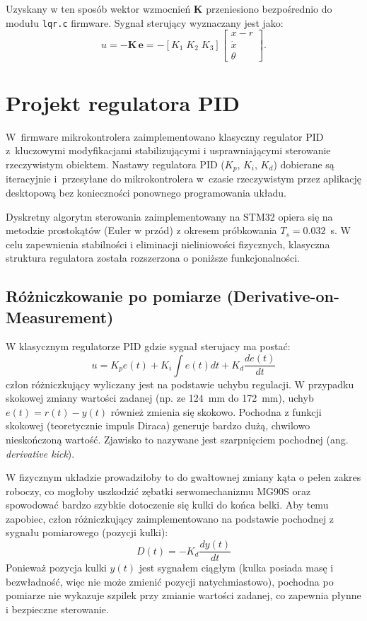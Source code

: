 Uzyskany w ten sposób wektor wzmocnień $\mathbf{K}$ przeniesiono bezpośrednio do modułu
\texttt{lqr.c} firmware.
Sygnał sterujący wyznaczany jest jako:
\begin{equation}
  u = -\mathbf{K}\,\mathbf{e} = -[K_1\;K_2\;K_3]\begin{bmatrix} x - r \\ \dot{x} \\ \theta \end{bmatrix}.
\end{equation}


\section{Projekt regulatora PID}

W~firmware mikrokontrolera zaimplementowano klasyczny regulator PID
z~kluczowymi modyfikacjami stabilizującymi i usprawniającymi sterowanie
rzeczywistym obiektem. Nastawy regulatora PID ($K_p$, $K_i$, $K_d$) dobierane
są iteracyjnie i~przesyłane do mikrokontrolera w~czasie rzeczywistym przez
aplikację desktopową bez konieczności ponownego programowania układu.

Dyskretny algorytm sterowania zaimplementowany na STM32 opiera się na metodzie
prostokątów (Euler w przód) z okresem próbkowania $T_s = 0.032$~s. W celu
zapewnienia stabilności i eliminacji nieliniowości fizycznych, klasyczna
struktura regulatora została rozszerzona o poniższe funkcjonalności.

\subsection{Różniczkowanie po pomiarze (Derivative-on-Measurement)}
W klasycznym regulatorze PID gdzie sygnał sterujacy ma postać:
\begin{equation}
  u = K_p e(t) + K_i \int e(t)dt + K_d \frac{de(t)}{dt}
\end{equation}
człon różniczkujący wyliczany jest na podstawie
uchybu regulacji. W przypadku skokowej zmiany
wartości zadanej (np. ze 124~mm do 172~mm), uchyb $e(t) = r(t) - y(t)$ również
zmienia się skokowo. Pochodna z funkcji skokowej (teoretycznie impuls Diraca)
generuje bardzo dużą, chwilowo nieskończoną wartość. Zjawisko to nazywane
jest szarpnięciem pochodnej (ang. \textit{derivative kick}).

W fizycznym układzie prowadziłoby to do gwałtownej zmiany kąta o pełen zakres roboczy,
co mogłoby uszkodzić zębatki serwomechanizmu MG90S oraz spowodować bardzo szybkie
dotoczenie się kulki do końca belki. Aby temu zapobiec, człon różniczkujący 
zaimplementowano na podstawie pochodnej z sygnału pomiarowego (pozycji kulki):
\begin{equation}
    D(t) = -K_d \frac{dy(t)}{dt}
\end{equation}
Ponieważ pozycja kulki $y(t)$ jest sygnałem ciągłym (kulka posiada masę
i bezwładność, więc nie może zmienić pozycji natychmiastowo), pochodna
po pomiarze nie wykazuje szpilek przy zmianie wartości zadanej, co zapewnia
płynne i bezpieczne sterowanie.

